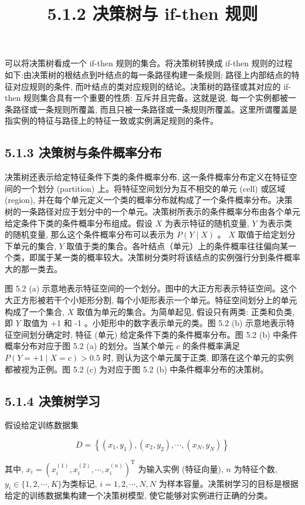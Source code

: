 \documentclass[10pt]{article}
\title{5.1.2 决策树与 if-then 规则 }
\author{}
\date{}
\begin{document}
\begin{CJK*}{UTF8}{bsmi}
\maketitle
可以将决策树看成一个 if-then 规则的集合。将决策树转换成 if-then 规则的过程如下:由决策树的根结点到叶结点的每一条路径构建一条规则; 路径上内部结点的特征对应规则的条件, 而叶结点的类对应规则的结论。决策树的路径或其对应的 if-then 规则集合具有一个重要的性质: 互斥并且完备。这就是说, 每一个实例都被一条路径或一条规则所覆盖, 而且只被一条路径或一条规则所覆盖。这里所谓覆盖是指实例的特征与路径上的特征一致或实例满足规则的条件。

\subsection*{5.1.3 决策树与条件概率分布}
决策树还表示给定特征条件下类的条件概率分布, 这一条件概率分布定义在特征空间的一个划分 (partition) 上。将特征空间划分为互不相交的单元 (cell) 或区域 (region), 并在每个单元定义一个类的概率分布就构成了一个条件概率分布。决策树的一条路径对应于划分中的一个单元。决策树所表示的条件概率分布由各个单元给定条件下类的条件概率分布组成。假设 $X$ 为表示特征的随机变量, $Y$ 为表示类的随机变量, 那么这个条件概率分布可以表示为 $P(Y \mid X)$ 。 $X$ 取值于给定划分下单元的集合, $Y$ 取值于类的集合。各叶结点（单元）上的条件概率往往偏向某一个类，即属于某一类的概率较大。决策树分类时将该结点的实例强行分到条件概率大的那一类去。

图 5.2 (a) 示意地表示特征空间的一个划分。图中的大正方形表示特征空间。这个大正方形被若干个小矩形分割, 每个小矩形表示一个单元。特征空间划分上的单元构成了一个集合, $X$ 取值为单元的集合。为简单起见, 假设只有两类: 正类和负类, 即 $Y$ 取值为 +1 和 -1 。小矩形中的数字表示单元的类。图 5.2 (b) 示意地表示特征空间划分确定时, 特征 (单元) 给定条件下类的条件概率分布。图 5.2 (b) 中条件概率分布对应于图 5.2 (a) 的划分。当某个单元 $c$ 的条件概率满足 $P(Y=+1 \mid X=c)>0.5$ 时, 则认为这个单元属于正类, 即落在这个单元的实例都被视为正例。图 5.2 (c) 为对应于图 5.2 (b) 中条件概率分布的决策树。

\subsection*{5.1.4 决策树学习}
假设给定训练数据集

$$
D=\left\{\left(x_{1}, y_{1}\right),\left(x_{2}, y_{2}\right), \cdots,\left(x_{N}, y_{N}\right)\right\}
$$

其中, $x_{i}=\left(x_{i}^{(1)}, x_{i}^{(2)}, \cdots, x_{i}^{(n)}\right)^{\mathrm{T}}$ 为输入实例 (特征向量), $n$ 为特征个数, $y_{i} \in\{1,2, \cdots, K\}$为类标记, $i=1,2, \cdots, N, N$ 为样本容量。决策树学习的目标是根据给定的训练数据集构建一个决策树模型, 使它能够对实例进行正确的分类。


\end{CJK*}
\end{document}
